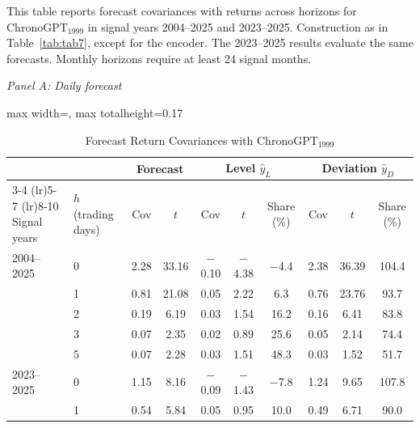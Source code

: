 \begin{table}[htbp]
\centering
\caption{Forecast Return Covariances with ChronoGPT$_{1999}$}
\label{tab:tabB_horizons}
\begin{minipage}{\linewidth}\footnotesize
This table reports forecast covariances with returns across horizons for ChronoGPT$_{1999}$ in signal years 2004--2025 and 2023--2025. Construction as in Table~\ref{tab:tab7}, except for the encoder. The 2023--2025 results evaluate the same forecasts. Monthly horizons require at least 24 signal months.
\end{minipage}
\medskip

{\footnotesize
\textit{Panel A: Daily forecast}\\[2pt]
\begin{adjustbox}{max width=\linewidth, max totalheight=0.17\textheight}
\begin{tabular}{llcccccccc}
\toprule
\multicolumn{2}{c}{} & \multicolumn{2}{c}{Forecast} & \multicolumn{3}{c}{Level $\hat y_L$} & \multicolumn{3}{c}{Deviation $\hat y_D$} \\
\cmidrule(lr){3-4} \cmidrule(lr){5-7} \cmidrule(lr){8-10}
Signal years & $h$ (trading days) & Cov & $t$ & Cov & $t$ & Share (\%) & Cov & $t$ & Share (\%) \\
\midrule
2004--2025 & 0 & \phantom{$-$}2.28 & \phantom{$-$}33.16 & $-$0.10 & $-$4.38 & \phantom{0}$-$4.4 & \phantom{$-$}2.38 & \phantom{$-$}36.39 & 104.4 \\
 & 1 & \phantom{$-$}0.81 & \phantom{$-$}21.08 & \phantom{$-$}0.05 & \phantom{$-$}2.22 & \phantom{$-$0}6.3 & \phantom{$-$}0.76 & \phantom{$-$}23.76 & \phantom{0}93.7 \\
 & 2 & \phantom{$-$}0.19 & \phantom{$-$0}6.19 & \phantom{$-$}0.03 & \phantom{$-$}1.54 & \phantom{$-$}16.2 & \phantom{$-$}0.16 & \phantom{$-$0}6.41 & \phantom{0}83.8 \\
 & 3 & \phantom{$-$}0.07 & \phantom{$-$0}2.35 & \phantom{$-$}0.02 & \phantom{$-$}0.89 & \phantom{$-$}25.6 & \phantom{$-$}0.05 & \phantom{$-$0}2.14 & \phantom{0}74.4 \\
 & 5 & \phantom{$-$}0.07 & \phantom{$-$0}2.28 & \phantom{$-$}0.03 & \phantom{$-$}1.51 & \phantom{$-$}48.3 & \phantom{$-$}0.03 & \phantom{$-$0}1.52 & \phantom{0}51.7 \\
\midrule
2023--2025 & 0 & \phantom{$-$}1.15 & \phantom{$-$0}8.16 & $-$0.09 & $-$1.43 & \phantom{0}$-$7.8 & \phantom{$-$}1.24 & \phantom{$-$0}9.65 & 107.8 \\
 & 1 & \phantom{$-$}0.54 & \phantom{$-$0}5.84 & \phantom{$-$}0.05 & \phantom{$-$}0.95 & \phantom{$-$}10.0 & \phantom{$-$}0.49 & \phantom{$-$0}6.71 & \phantom{0}90.0 \\

\end{tabular}
\end{adjustbox}}
\end{table}
